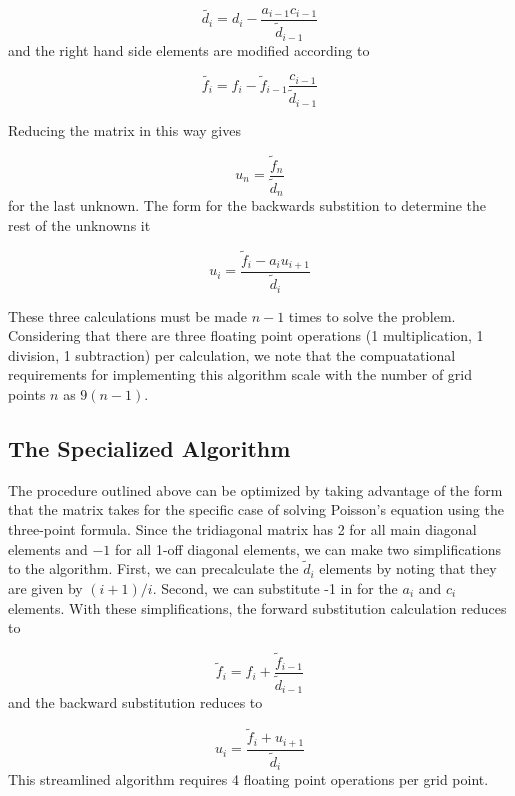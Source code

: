 \documentclass[10pt,showpacs,preprintnumbers,footinbib,amsmath,amssymb,aps,prl,twocolumn,groupedaddress,superscriptaddress,showkeys]{revtex4-1}
\begin{document}
\begin{equation*}
	\tilde{d_i} = d_i - \frac{a_{i-1} c_{i-1}}{\tilde{d}_{i-1}}
\end{equation*}
and the right hand side elements are modified according to

\begin{equation*}
	\tilde{f_i} = f_i - \tilde{f}_{i-1} \frac{c_{i-1}}{\tilde{d}_{i-1}}
\end{equation*}

Reducing the matrix in this way gives

\begin{equation*}
	u_n = \frac{\tilde{f}_n}{\tilde{d}_n}
\end{equation*}
for the last unknown. The form for the backwards substition to determine the
rest of the unknowns it

\begin{equation*}
	u _i = \frac{\tilde{f}_i - a_i u_{i+1}}{\tilde{d}_i}
\end{equation*}

These three calculations must be made $n-1$ times to solve the problem. Considering
that there are three floating point operations (1 multiplication, 1 division,
1 subtraction) per calculation, we note that the compuatational requirements
for implementing this algorithm scale with the number of grid points $n$ as $9(n-1)$.

\subsection*{The Specialized Algorithm}

The procedure outlined above can be optimized by taking advantage of the form that
the matrix takes for the specific case of solving Poisson's equation
using the three-point formula. Since the tridiagonal matrix has 2 for all main
diagonal elements and $-1$ for all 1-off diagonal elements, we can make two
simplifications to the algorithm. First, we can precalculate the $\tilde{d}_i$
elements by noting that they are given by $(i+1)/i$. Second, we can substitute -1
in for the $a_i$ and $c_i$ elements. With these simplifications, the forward
substitution calculation reduces to

\begin{equation*}
	\tilde{f}_i = f_i + \frac{ \tilde{f}_{i-1}}{\tilde{d}_{i-1}}
\end{equation*}
and the backward substitution reduces to

\begin{equation*}
	u_i = \frac{ \tilde{f}_i + u_{i+1}} {\tilde{d}_i}
\end{equation*}
This streamlined algorithm requires 4 floating point operations per grid point.
\end{document}
